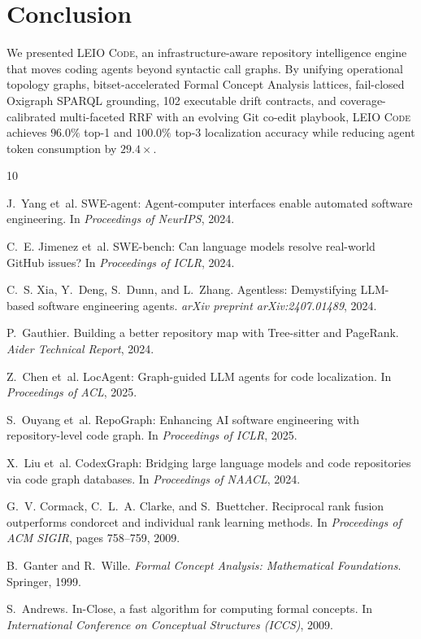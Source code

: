 \documentclass[11pt]{article}
\begin{document}
\section{Conclusion}

We presented \textsc{LEIO Code}, an infrastructure-aware repository intelligence engine that moves coding agents beyond syntactic call graphs. By unifying operational topology graphs, bitset-accelerated Formal Concept Analysis lattices, fail-closed Oxigraph SPARQL grounding, 102 executable drift contracts, and coverage-calibrated multi-faceted RRF with an evolving Git co-edit playbook, \textsc{LEIO Code} achieves $96.0\%$ top-1 and $100.0\%$ top-3 localization accuracy while reducing agent token consumption by $29.4\times$.

\begin{thebibliography}{10}

J.~Yang et~al.
\newblock SWE-agent: Agent-computer interfaces enable automated software engineering.
\newblock In \emph{Proceedings of NeurIPS}, 2024.

C.~E. Jimenez et~al.
\newblock SWE-bench: Can language models resolve real-world GitHub issues?
\newblock In \emph{Proceedings of ICLR}, 2024.

C.~S. Xia, Y.~Deng, S.~Dunn, and L.~Zhang.
\newblock Agentless: Demystifying LLM-based software engineering agents.
\newblock \emph{arXiv preprint arXiv:2407.01489}, 2024.

P.~Gauthier.
\newblock Building a better repository map with Tree-sitter and PageRank.
\newblock \emph{Aider Technical Report}, 2024.

Z.~Chen et~al.
\newblock LocAgent: Graph-guided LLM agents for code localization.
\newblock In \emph{Proceedings of ACL}, 2025.

S.~Ouyang et~al.
\newblock RepoGraph: Enhancing AI software engineering with repository-level code graph.
\newblock In \emph{Proceedings of ICLR}, 2025.

X.~Liu et~al.
\newblock CodexGraph: Bridging large language models and code repositories via code graph databases.
\newblock In \emph{Proceedings of NAACL}, 2024.

G.~V. Cormack, C.~L.~A. Clarke, and S.~Buettcher.
\newblock Reciprocal rank fusion outperforms condorcet and individual rank learning methods.
\newblock In \emph{Proceedings of ACM SIGIR}, pages 758--759, 2009.

B.~Ganter and R.~Wille.
\newblock \emph{Formal Concept Analysis: Mathematical Foundations}.
\newblock Springer, 1999.

S.~Andrews.
\newblock In-Close, a fast algorithm for computing formal concepts.
\newblock In \emph{International Conference on Conceptual Structures (ICCS)}, 2009.

\end{thebibliography}
\end{document}
